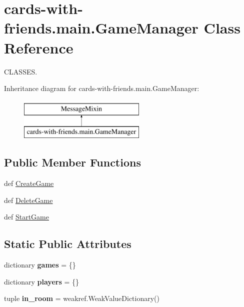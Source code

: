 \hypertarget{classcards-with-friends_1_1main_1_1_game_manager}{\section{cards-\/with-\/friends.main.\-Game\-Manager Class Reference}
\label{classcards-with-friends_1_1main_1_1_game_manager}
}


C\-L\-A\-S\-S\-E\-S.  


Inheritance diagram for cards-\/with-\/friends.main.\-Game\-Manager\-:\begin{figure}[H]
\begin{center}
\leavevmode
\includegraphics[height=2.000000cm]{classcards-with-friends_1_1main_1_1_game_manager}
\end{center}
\end{figure}
\subsection*{Public Member Functions}
\begin{DoxyCompactItemize}
\item 
def \hyperlink{classcards-with-friends_1_1main_1_1_game_manager_a8bd05763ca0177454d4b0620a739b3ac}{Create\-Game}
\item 
def \hyperlink{classcards-with-friends_1_1main_1_1_game_manager_aa9a818023bacf5cbf1a6862e6c53d840}{Delete\-Game}
\item 
def \hyperlink{classcards-with-friends_1_1main_1_1_game_manager_ac6bc592b254796ea9e4376285401d688}{Start\-Game}
\end{DoxyCompactItemize}
\subsection*{Static Public Attributes}
\begin{DoxyCompactItemize}
\item 
\hypertarget{classcards-with-friends_1_1main_1_1_game_manager_ac4794e33676e2c740874d72a2174b7df}{dictionary {\bfseries games} = \{\}}\label{classcards-with-friends_1_1main_1_1_game_manager_ac4794e33676e2c740874d72a2174b7df}

\item 
\hypertarget{classcards-with-friends_1_1main_1_1_game_manager_a81dcc2d29e24e67f3f8e03a0a6e7d817}{dictionary {\bfseries players} = \{\}}\label{classcards-with-friends_1_1main_1_1_game_manager_a81dcc2d29e24e67f3f8e03a0a6e7d817}

\item 
\hypertarget{classcards-with-friends_1_1main_1_1_game_manager_ac6a25f45208944621318ba8aa179a359}{tuple {\bfseries in\-\_\-room} = weakref.\-Weak\-Value\-Dictionary()}\label{classcards-with-friends_1_1main_1_1_game_manager_ac6a25f45208944621318ba8aa179a359}

\end{DoxyCompactItemize}


